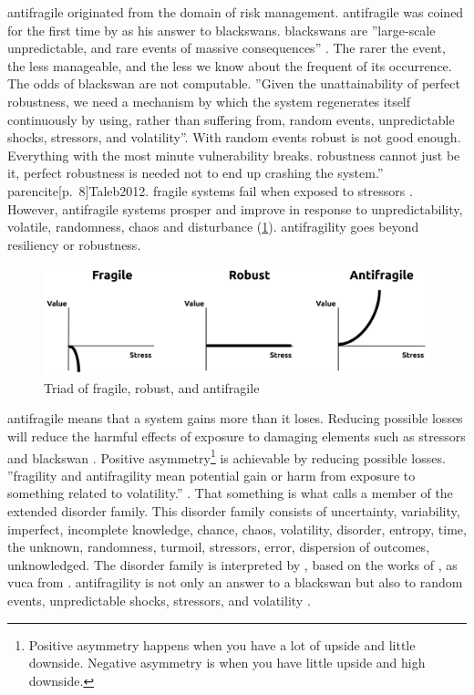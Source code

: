 \Gls{antifragile} originated from the domain of risk management. \Gls{antifragile} was coined for the first time by \textcite{Taleb2012} as his answer to \glspl{blackswan}. \Glspl{blackswan} are ''large-scale unpredictable, and rare events of massive consequences'' \parencite[pp.~6--7]{Taleb2012}. The rarer the event, the less manageable, and the less we know about the frequent of its occurrence. The odds of \gls{blackswan} are not computable. ''Given the unattainability of perfect robustness, we need a mechanism by which the system regenerates itself continuously by using, rather than suffering from, random events, unpredictable shocks, \glspl{stressor}, and \gls{volatility}''. With random events \gls{robust} is not good enough. Everything with the most minute vulnerability breaks. \Gls{robustness} cannot just be it, perfect \gls{robustness} is needed not to end up crashing the system.'' parencite[p.~8]{Taleb2012}. \Gls{fragile} systems fail when exposed to \glspl{stressor} \parencite[p.~21]{Ghasemi2017}. However, \gls{antifragile} systems prosper and improve in response to unpredictability, \gls{volatile}, randomness, chaos and disturbance (\cref{fig:eaal-triad}). \Gls{antifragility} goes beyond \gls{resiliency} or \gls{robustness}.
\begin{figure}[H]
	\centering
	\includegraphics[width=0.8\linewidth]{images/eaal-triad}
	\caption[Triad of fragile, robust, and antifragile \parencite{Botjes2021}]{Triad of fragile, robust, and antifragile \parencite{Botjes2021}}
	\label{fig:eaal-triad}
\end{figure}
\Gls{antifragile} means that a system gains more than it loses. Reducing possible losses will reduce the harmful effects of exposure to damaging elements such as \glspl{stressor} and \gls{blackswan} \parencite[p.~932]{Russo2017}. Positive asymmetry\footnote{Positive asymmetry happens when you have a lot of upside and little downside. Negative asymmetry is when you have little upside and high downside.} is achievable by reducing possible losses. ''\Gls{fragility} and \gls{antifragility} mean potential gain or harm from exposure to something related to \gls{volatility}.'' \parencite[p.~13]{Taleb2012}. That something is what \textcite[p.~13]{Taleb2012} calls a member of the extended disorder family. This disorder family consists of \gls{uncertainty}, variability, imperfect, incomplete knowledge, chance, chaos, \gls{volatility}, disorder, \gls{entropy}, time, the unknown, randomness, turmoil, \glspl{stressor}, error, dispersion of outcomes, unknowledged. The disorder family is interpreted by \textcite[p.~12]{Botjes2020}, based on the works of \textcites[p.~436]{Taleb2012}[p.~3]{Gorgeon2015}, as \acrlong{vuca} from \textcite{Bennis1985}. \Gls{antifragility} is not only an answer to a \gls{blackswan} but also to random events, unpredictable shocks, \glspl{stressor}, and \gls{volatility} \parencite[p.~8]{Taleb2012}.

